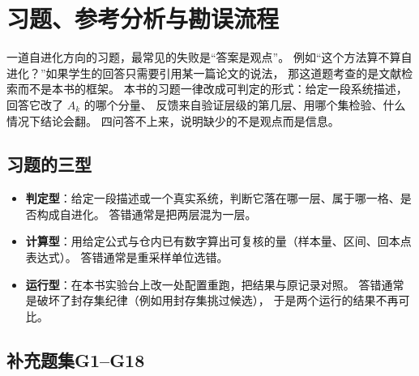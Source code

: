 \chapter{习题、参考分析与勘误流程}
\label{app:exercises}

\begin{failurebox}
一道自进化方向的习题，最常见的失败是“答案是观点”。
例如“这个方法算不算自进化？”如果学生的回答只需要引用某一篇论文的说法，
那这道题考查的是文献检索而不是本书的框架。
本书的习题一律改成可判定的形式：给定一段系统描述，回答它改了 $A_k$ 的哪个分量、
反馈来自验证层级的第几层、用哪个集检验、什么情况下结论会翻。
四问答不上来，说明缺少的不是观点而是信息。
\end{failurebox}

\section{习题的三型}

\begin{itemize}
  \item \textbf{判定型}：给定一段描述或一个真实系统，判断它落在哪一层、属于哪一格、是否构成自进化。
        答错通常是把两层混为一层。
  \item \textbf{计算型}：用给定公式与仓内已有数字算出可复核的量（样本量、区间、回本点表达式）。
        答错通常是重采样单位选错。
  \item \textbf{运行型}：在本书实验台上改一处配置重跑，把结果与原记录对照。
        答错通常是破坏了封存集纪律（例如用封存集挑过候选），
        于是两个运行的结果不再可比。
\end{itemize}



\section{补充题集G1--G18}

